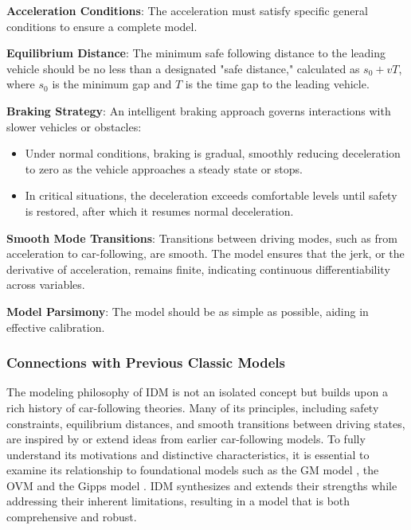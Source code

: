 \documentclass[a4paper,fleqn]{cas-sc}
\begin{document}
\begin{enumerate}
    \item \textbf{Acceleration Conditions}: The acceleration must satisfy specific general conditions to ensure a complete model.

    \item \textbf{Equilibrium Distance}: The minimum safe following distance to the leading vehicle should be no less than a designated "safe distance," calculated as $s_0 + vT$, where $s_0$ is the minimum gap and $T$ is the time gap to the leading vehicle.

    \item \textbf{Braking Strategy}: An intelligent braking approach governs interactions with slower vehicles or obstacles:
    \begin{itemize}
        \item Under normal conditions, braking is gradual, smoothly reducing deceleration to zero as the vehicle approaches a steady state or stops.
        \item In critical situations, the deceleration exceeds comfortable levels until safety is restored, after which it resumes normal deceleration.
    \end{itemize}

    \item \textbf{Smooth Mode Transitions}: Transitions between driving modes, such as from acceleration to car-following, are smooth. The model ensures that the jerk, or the derivative of acceleration, remains finite, indicating continuous differentiability across variables.

    {\item \textbf{Model Parsimony}: The model should be as simple as possible, aiding in effective calibration.}
\end{enumerate}


\subsubsection{Connections with Previous Classic Models}

The modeling philosophy of IDM is not an isolated concept but builds upon a rich history of car-following theories. Many of its principles, including safety constraints, equilibrium distances, and smooth transitions between driving states, are inspired by or extend ideas from earlier car-following models. To fully understand its motivations and distinctive characteristics, it is essential to examine its relationship to foundational models such as the GM model \citep{chandlerTrafficDynamicsStudiesCar1958}, the OVM \citep{bandoDynamicalModelTrafficCongestion1995} and the Gipps model \citep{gippsBehaviouralCarfollowingModelComputer1981}. IDM synthesizes and extends their strengths while addressing their inherent limitations, resulting in a model that is both comprehensive and robust.
\end{document}
